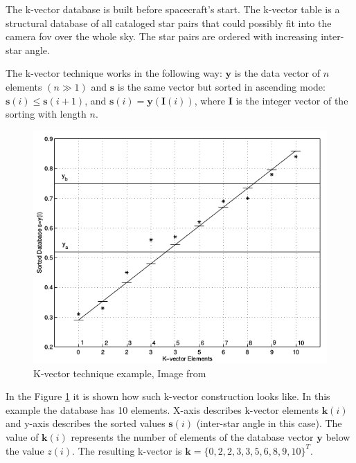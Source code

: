 \documentclass[12pt,a4paper,twoside]{article}
\begin{document}
The k-vector database is built before spacecraft's start. The k-vector table is a structural database of all cataloged star pairs that could possibly fit into the camera \gls{fov} over the whole sky.
The star pairs are ordered with increasing inter-star angle.

The k-vector technique works in the following way: $\bm{y}$ is the data vector of $n$ elements $(n \gg 1)$ and $\bm{s}$ is the same vector but sorted in ascending mode: $\bm{s}(i) \le \bm{s}(i+1)$, and $\bm{s}(i) = \bm{y}(\bm{I}(i))$, where $\bm{I}$ is the integer vector of the sorting with length $n$\cite{mortari2013k}.


\begin{figure}[!htbp]
\includegraphics[scale=0.57]{k-vector-example.png}
\centering
\caption[K-vector technique example]{K-vector technique example, Image from \citep{mortari2000k}}
\label{fig:k-vector-example}
\end{figure}

In the Figure \ref{fig:k-vector-example} it is shown how such k-vector construction looks like. In this example the database has 10 elements. X-axis describes k-vector elements $\bm{k}(i)$ and y-axis describes the sorted values $\bm{s}(i)$ (inter-star angle in this case). The value of $\bm{k}(i)$ represents the number of elements of the database vector $\bm{y}$ below the value $z(i)$.
The resulting k-vector is $\bm{k} = \{0, 2, 2, 3, 3, 5, 6, 8, 9, 10\}^T$.
\end{document}
